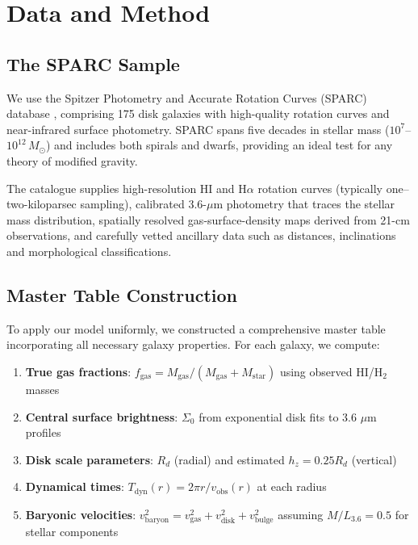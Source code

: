 \documentclass[twocolumn,prd,amsmath,amssymb,aps,superscriptaddress,nofootinbib]{revtex4-2}
\newcommand{\Msun}{M_{\odot}}
\begin{document}
\section{Data and Method}
\label{sec:data}

\subsection{The SPARC Sample}

We use the Spitzer Photometry and Accurate Rotation Curves (SPARC) database \cite{Lelli2016}, comprising 175 disk galaxies with high-quality rotation curves and near-infrared surface photometry. SPARC spans five decades in stellar mass ($10^7$--$10^{12}\,\Msun$) and includes both spirals and dwarfs, providing an ideal test for any theory of modified gravity.

The catalogue supplies high-resolution HI and H$\alpha$ rotation curves (typically one–two-kiloparsec sampling), calibrated 3.6-$\mu$m photometry that traces the stellar mass distribution, spatially resolved gas-surface-density maps derived from 21-cm observations, and carefully vetted ancillary data such as distances, inclinations and morphological classifications.

\subsection{Master Table Construction}

To apply our model uniformly, we constructed a comprehensive master table incorporating all necessary galaxy properties. For each galaxy, we compute:

\begin{enumerate}
\item \textbf{True gas fractions}: $f_{\text{gas}} = M_{\text{gas}}/(M_{\text{gas}} + M_{\text{star}})$ using observed HI/H$_2$ masses
\item \textbf{Central surface brightness}: $\Sigma_0$ from exponential disk fits to 3.6 $\mu$m profiles
\item \textbf{Disk scale parameters}: $R_d$ (radial) and estimated $h_z = 0.25 R_d$ (vertical)
\item \textbf{Dynamical times}: $T_{\text{dyn}}(r) = 2\pi r/v_{\text{obs}}(r)$ at each radius
\item \textbf{Baryonic velocities}: $v_{\text{baryon}}^2 = v_{\text{gas}}^2 + v_{\text{disk}}^2 + v_{\text{bulge}}^2$ assuming $M/L_{3.6} = 0.5$ for stellar components
\end{enumerate}
\end{document}
